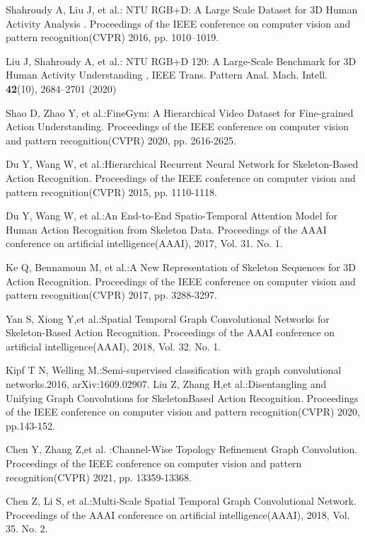\documentclass[runningheads]{llncs}
\begin{document}
\begin{thebibliography}{8}


Shahroudy A, Liu J, et al.: NTU RGB+D: A Large Scale Dataset for 3D Human Activity Analysis
.  Proceedings of the IEEE conference on computer vision and pattern recognition(CVPR) 2016, pp. 1010–1019.

Liu J, Shahroudy A, et al.: NTU RGB+D 120: A Large-Scale Benchmark for 3D Human Activity Understanding
, IEEE Trans. Pattern Anal. Mach. Intell. \textbf{42}(10), 2684–2701 (2020)



Shao D, Zhao Y, et al.:FineGym: A Hierarchical Video Dataset for Fine-grained Action Understanding.  Proceedings of the IEEE conference on computer vision and pattern recognition(CVPR) 2020, pp. 2616-2625.

Du Y, Wang W, et al.:Hierarchical Recurrent Neural Network for Skeleton-Based Action Recognition.
Proceedings of the IEEE conference on computer vision and pattern recognition(CVPR) 2015, pp. 1110-1118.

Du Y, Wang W, et al.:An End-to-End Spatio-Temporal Attention Model for Human Action Recognition
from Skeleton Data.
Proceedings of the AAAI conference on artificial intelligence(AAAI), 2017, Vol. 31. No. 1.


Ke Q, Bennamoun M, et al.:A New Representation of Skeleton Sequences for 3D Action Recognition.
Proceedings of the IEEE conference on computer vision and pattern recognition(CVPR) 2017, pp. 3288-3297.

Yan S, Xiong Y,et al.:Spatial Temporal Graph Convolutional Networks for Skeleton-Based Action Recognition.
Proceedings of the AAAI conference on artificial intelligence(AAAI), 2018, Vol. 32. No. 1.

Kipf T N, Welling M.:Semi-supervised classification with graph convolutional networks.2016, arXiv:1609.02907.
Liu Z, Zhang H,et al.:Disentangling and Unifying Graph Convolutions for SkeletonBased Action Recognition.
Proceedings of the IEEE conference on computer vision and pattern recognition(CVPR) 2020, pp.143-152.

Chen Y, Zhang Z,et al. :Channel-Wise Topology Refinement Graph Convolution.
Proceedings of the IEEE conference on computer vision and pattern recognition(CVPR) 2021, pp. 13359-13368.

Chen Z, Li S,  et al.:Multi-Scale Spatial Temporal Graph Convolutional Network.
Proceedings of the AAAI conference on artificial intelligence(AAAI), 2018, Vol. 35. No. 2.



\end{thebibliography}
\end{document}
